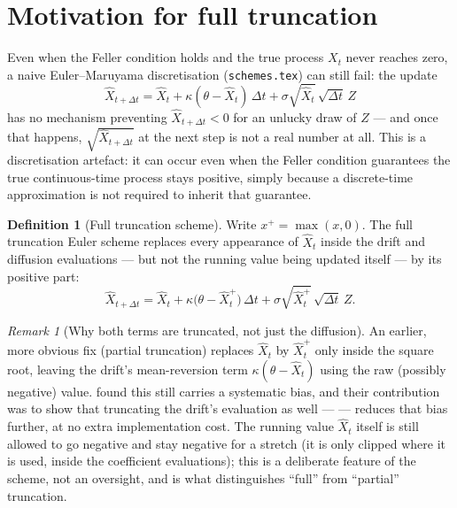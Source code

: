 \documentclass[11pt]{article}
\theoremstyle{plain}
\theoremstyle{definition}
\newtheorem{definition}{Definition}
\theoremstyle{remark}
\newtheorem{remark}{Remark}
\begin{document}
\section{Motivation for full truncation}

Even when the Feller condition holds and the true process $X_t$
never reaches zero, a naive Euler--Maruyama discretisation
(\texttt{schemes.tex}) can still fail: the update
\[
   \hat X_{t+\Delta t} = \hat X_t + \kappa(\theta-\hat X_t)\,\Delta t
                          + \sigma\sqrt{\hat X_t}\,\sqrt{\Delta t}\,Z
\]
has no mechanism preventing $\hat X_{t+\Delta t}<0$ for an unlucky
draw of $Z$ --- and once that happens, $\sqrt{\hat X_{t+\Delta t}}$ at
the next step is not a real number at all. This is a
discretisation artefact: it can occur even when the Feller condition
guarantees the true continuous-time process stays positive, simply
because a discrete-time approximation is not required to inherit that
guarantee.

\begin{definition}[Full truncation scheme]\label{def:fulltrunc}
Write $x^+=\max(x,0)$. The full truncation Euler scheme
 replaces every appearance of $\hat X_t$
inside the drift and diffusion evaluations --- but not the running
value being updated itself --- by its positive part:
\[
   \hat X_{t+\Delta t} = \hat X_t + \kappa\big(\theta-\hat X_t^+\big)\,\Delta t
                          + \sigma\sqrt{\hat X_t^+}\,\sqrt{\Delta t}\,Z .
\]
\end{definition}

\begin{remark}[Why both terms are truncated, not just the diffusion]
An earlier, more obvious fix (partial truncation) replaces
$\hat X_t$ by $\hat X_t^+$ only inside the square root, leaving the
drift's mean-reversion term $\kappa(\theta-\hat X_t)$ using the raw
(possibly negative) value.  found this still
carries a systematic bias, and their contribution was to show that
truncating the drift's evaluation as well --- 
--- reduces that bias further, at no extra implementation cost. The
running value $\hat X_t$ itself is still allowed to go negative and
stay negative for a stretch (it is only clipped where it is
used, inside the coefficient evaluations); this is a
deliberate feature of the scheme, not an oversight, and is what
distinguishes ``full'' from ``partial'' truncation.
\end{remark}
\end{document}
